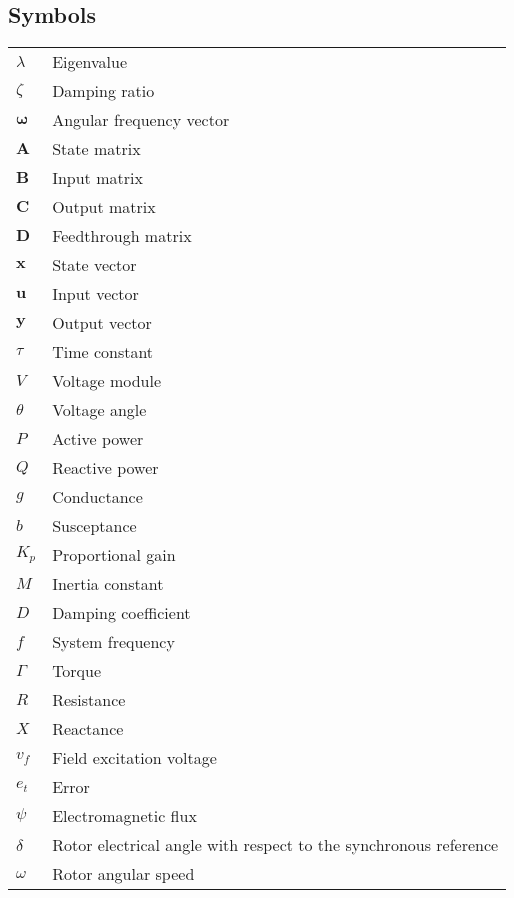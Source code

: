 \subsection*{Symbols}
\begin{tabular}{l@{\hspace{1.95cm}} l}
  $\lambda$ & Eigenvalue \\
  $\zeta$ & Damping ratio \\
  $\bm{\omega}$ & Angular frequency vector \\
  $\bm{A}$ & State matrix \\
  $\bm{B}$ & Input matrix \\
  $\bm{C}$ & Output matrix \\
  $\bm{D}$ & Feedthrough matrix \\
  $\bm{x}$ & State vector \\
  $\bm{u}$ & Input vector \\
  $\bm{y}$ & Output vector \\
  $\tau$ & Time constant \\
  $V$ & Voltage module \\
  $\theta$ & Voltage angle\\
  $P$ & Active power\\
  $Q$ & Reactive power\\
  $g$ & Conductance\\
  $b$ & Susceptance\\
  $K_p$ & Proportional gain\\
  $M$ & Inertia constant\\
  $D$ & Damping coefficient\\
  $f$ & System frequency\\
  $\Gamma$ & Torque \\
  $R$ & Resistance \\
  $X$ & Reactance\\
  $v_f$ & Field excitation voltage\\
  $e_t$ & Error\\
  $\psi$ & Electromagnetic flux\\
  $\delta$ & Rotor electrical angle with respect to the synchronous reference\\
  $\omega$ & Rotor angular speed\\
  

  
 
\end{tabular}


